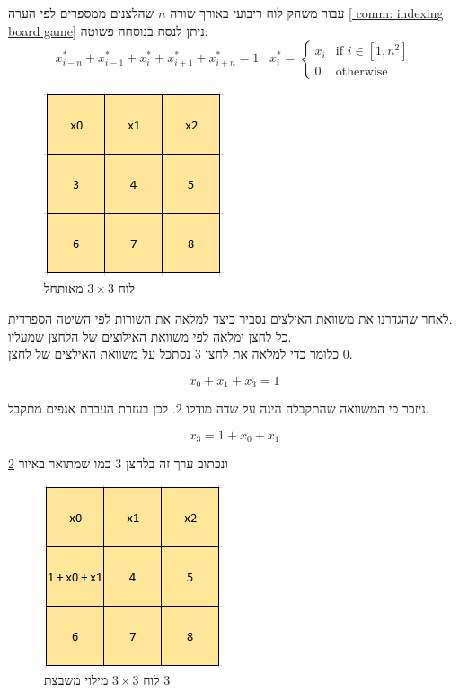 \documentclass[12pt,twoside]{article}
\begin{document}
עבור משחק לוח
ריבועי באורך שורה 
$n$
שהלצנים ממספרים לפי הערה
\ref{ comm: indexing board game}
ניתן לנסח בנוסחה פשוטה:
\begin{equation}
    \label{eq: depndeciy equation}
    x^*_{i - n} + x^*_{i - 1} + x^*_{i} + x^*_{i + 1} + x^*_{i + n} = 1
    \hspace{10pt}
    x^*_i =
    \begin{cases}
        x_i & \text{if $i \in [1,n^2]$} \\
        0 & \text{otherwise}
    \end{cases}
\end{equation}

\begin{figure}[ht]
    \caption{לוח 
    $3 \times 3$
    מאותחל}
    \label{fig: 3 x 3 board init spanish}
    \unsethebrew
    \centering
    \includegraphics[width=.3\textwidth,height=.3\textheight,keepaspectratio]{images/3x3_first_row.PNG}
\end{figure}
\sethebrew

לאחר שהגדרנו את משוואת האילצים נסביר כיצד למלאה 
את השורות לפי השיטה הספרדית.
\\
כל לחצן ימלאה לפי משוואת האילוצים של הלחצן שמעליו.
\\
כלומר 
כדי למלאה את לחצן 
$3$
נסתכל על משוואת האילצים של לחצן 
$0$.

\[ x_0 + x_1 + x_3 = 1\]

ניזכר כי המשוואה שהתקבלה הינה על שדה מודלו
$2$.
לכן בעזרת העברת אגפים מתקבל.

\[ x_3 = 1 + x_0 + x_1 \]

ונכתוב ערך זה בלחצן 
$3$
כמו שמתואר באיור 
\ref{fig: 3 x 3 board fill button 3}

\begin{figure}[ht]
    \caption{לוח 
    $3 \times 3$
    מילוי משבצת
    $3$}
    \label{fig: 3 x 3 board fill button 3}
    \unsethebrew
    \centering
    \includegraphics[width=.3\textwidth,height=.3\textheight,keepaspectratio]{images/3x3_fill_button_3.PNG}
\end{figure}
\sethebrew
\end{document}
